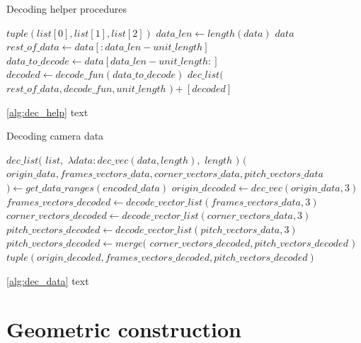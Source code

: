 \documentclass[
    11pt,
    oneside
]{report}
\begin{document}
\begin{algorithm}[H]
\begin{algorithmic}
\caption{Decoding helper procedures}\label{alg:dec_help}
    \Return $tuple(list[0], list[1], list[2])$
\EndProcedure
{}
    \State
    $data\_len \gets length(data)$
        \Return $data$
    \EndIf
    \State $rest\_of\_data \gets data[:data\_len - unit\_length]$
    \State $data\_to\_decode \gets data[data\_len - unit\_length:]$
    \State $decoded \gets decode\_fun(data\_to\_decode)$
    \State
    \Return $dec\_list($
            \State \indent $rest\_of\_data,decode\_fun,unit\_length$
    \State $) + [decoded]$
\EndProcedure
\end{algorithmic}
\end{algorithm}


\ref{alg:dec_help} text


\begin{algorithm}[H]
\begin{algorithmic}
\caption{Decoding camera data}\label{alg:dec_data}
    \Return $dec\_list($
        \State \indent $list,$
        \State \indent $\lambda data: dec\_vec(data, length),$
        \State \indent $length$
    \State $)$
\EndProcedure
{}
    \State $($
    \State \indent $origin\_data, frames\_vectors\_data, corner\_vectors\_data, pitch\_vectors\_data$
    \State $) \gets get\_data\_ranges(encoded\_data)$
    \State $origin\_decoded \gets dec\_vec(origin\_data, 3)$
    \State $frames\_vectors\_decoded \gets decode\_vector\_list(frames\_vectors\_data, 3)$
    \State $corner\_vectors\_decoded \gets decode\_vector\_list(corner\_vectors\_data, 3)$
    \State $pitch\_vectors\_decoded \gets decode\_vector\_list(pitch\_vectors\_data, 3)$
    \State $pitch\_vectors\_decoded \gets merge($
        \State \indent $corner\_vectors\_decoded, pitch\_vectors\_decoded$
    \State $)$
    \State
    \Return $tuple(origin\_decoded, frames\_vectors\_decoded, pitch\_vectors\_decoded)$
\EndProcedure
\end{algorithmic}
\end{algorithm}


\ref{alg:dec_data} text


\section{Geometric construction}
\end{document}
